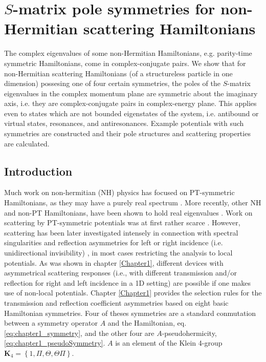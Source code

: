 
\chapter{$S$-matrix pole symmetries for non-Hermitian scattering Hamiltonians}
\label{Chapter2}

The complex eigenvalues of some non-Hermitian Hamiltonians, e.g. parity-time symmetric Hamiltonians, come in complex-conjugate pairs. We show that for non-Hermitian scattering Hamiltonians (of a structureless particle in one dimension) possesing one of four certain symmetries, the poles of the $S$-matrix eigenvalues in the complex  momentum plane are symmetric about the imaginary axis, i.e. they  are complex-conjugate pairs in complex-energy plane. This applies even to states which are not bounded eigenstates of the system, i.e. antibound or virtual states, resonances, and antiresonances. Example potentials with such symmetries are constructed and their pole structures and scattering properties are calculated.
%
\newpage
%
\section{Introduction}

Much work on non-hermitian (NH) physics has focused on PT-symmetric Hamiltonians, as they may have a purely real spectrum \cite{Bender1998}. More recently, other NH and non-PT Hamiltonians, have been shown to hold real eigenvalues \cite{Nixon2016,Chen2017,Yang2017}. Work on scattering by PT-symmetric potentials was at first rather scarce \cite{Muga2004,Ruschhaupt2005,Cannata2007,Znojil2015}. However, scattering has been later investigated intensely in connection with spectral singularities and reflection asymmetries for left or right incidence (i.e. unidirectional invisibility) \cite{Mostafazadeh2009,Longhi2014,Mostafazadeh2013}, in most cases restricting the analysis to local potentials. As was shown in chapter \ref{Chapter1}, different devices with asymmetrical scattering responses (i.e., with different transmission and/or reflection for right and left incidence in a 1D setting) are possible if one makes use of non-local potentials. Chapter \ref{Chapter1} provides the selection rules for the transmission and reflection coefficient asymmetries based on eight basic Hamiltonian symmetries. Four of theses symmetries are a standard conmutation between a symmetry operator $A$ and the Hamiltonian, eq. \eqref{eq:chapter1_symmetry}, and the other four are $A$-pseudohermicity, \eqref{eq:chapter1_pseudoSymmetry}. $A$ is an element of the Klein 4-group $\mathbf{K}_4 = \left\{1,\Pi,\Theta,\Theta\Pi\right\}$.

